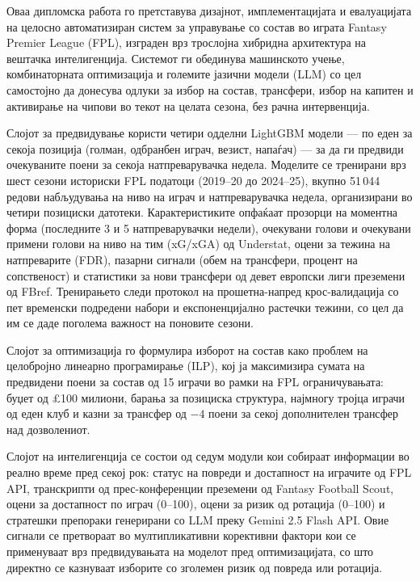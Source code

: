 
Оваа дипломска работа го претставува дизајнот, имплементацијата и евалуацијата на целосно автоматизиран систем за управување со состав во играта Fantasy Premier League (FPL), изграден врз трослојна хибридна архитектура на вештачка интелигенција. Системот ги обединува машинското учење, комбинаторната оптимизација и големите јазични модели (LLM) со цел самостојно да донесува одлуки за избор на состав, трансфери, избор на капитен и активирање на чипови во текот на целата сезона, без рачна интервенција.

Слојот за предвидување користи четири одделни LightGBM модели — по еден за секоја позиција (голман, одбранбен играч, везист, напаѓач) — за да ги предвиди очекуваните поени за секоја натпреварувачка недела. Моделите се тренирани врз шест сезони историски FPL податоци (2019--20 до 2024--25), вкупно 51\,044 редови набљудувања на ниво на играч и натпреварувачка недела, организирани во четири позициски датотеки. Карактеристиките опфаќаат прозорци на моментна форма (последните 3 и 5 натпреварувачки недели), очекувани голови и очекувани примени голови на ниво на тим (xG/xGA) од Understat, оцени за тежина на натпреварите (FDR), пазарни сигнали (обем на трансфери, процент на сопственост) и статистики за нови трансфери од девет европски лиги преземени од FBref. Тренирањето следи протокол на прошетна-напред крос-валидација со пет временски подредени набори и експоненцијално растечки тежини, со цел да им се даде поголема важност на поновите сезони.

Слојот за оптимизација го формулира изборот на состав како проблем на целобројно линеарно програмирање (ILP), кој ја максимизира сумата на предвидени поени за состав од 15 играчи во рамки на FPL ограничувањата: буџет од \pounds 100 милиони, барања за позициска структура, најмногу тројца играчи од еден клуб и казни за трансфер од $-4$ поени за секој дополнителен трансфер над дозволениот.

Слојот на интелигенција се состои од седум модули кои собираат информации во реално време пред секој рок: статус на повреди и достапност на играчите од FPL API, транскрипти од прес-конференции преземени од Fantasy Football Scout, оцени за достапност по играч (0--100), оцени за ризик од ротација (0--100) и стратешки препораки генерирани со LLM преку Gemini 2.5 Flash API. Овие сигнали се претвораат во мултипликативни корективни фактори кои се применуваат врз предвидувањата на моделот пред оптимизацијата, со што директно се казнуваат изборите со зголемен ризик од повреда или ротација.

